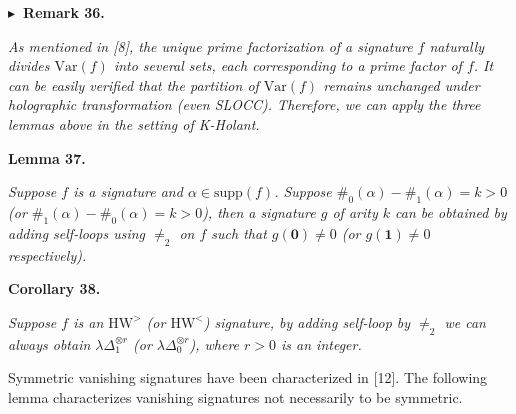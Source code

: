 \documentclass[10pt,a4paper]{article}
\begin{document}




\par\medskip\noindent\textbf{
$\blacktriangleright$ Remark 36.
}\par



\emph{As mentioned in [8], the unique prime factorization of a signature $f$ naturally divides $\text{Var}(f)$ into several sets, each corresponding to a prime factor of $f$. It can be easily verified that the partition of $\text{Var}(f)$ remains unchanged under holographic transformation (even SLOCC). Therefore, we can apply the three lemmas above in the setting of K-Holant.}\par







\par\medskip\noindent\textbf{
\textbf{Lemma 37}\textbf{.}
}\par



\emph{Suppose $f$ is a signature and $\alpha\in\text{supp}(f)$. Suppose $\#_{0}(\alpha)-\#_{1}(\alpha)=k>0$ (or $\#_{1}(\alpha)-\#_{0}(\alpha)=k>0$), then a signature $g$ of arity $k$ can be obtained by adding self-loops using $\neq_{2}$ on $f$ such that $g(\textbf{0})\neq 0$ (or $g(\textbf{1})\neq 0$ respectively).}\par







\par\medskip\noindent\textbf{
\textbf{Corollary 38}\textbf{.}
}\par



\emph{Suppose $f$ is an $\text{HW}^{>}$ (or $\text{HW}^{<}$) signature, by adding self-loop by $\neq_{2}$ we can always obtain $\lambda\Delta_{1}^{\otimes r}$ (or $\lambda\Delta_{0}^{\otimes r}$), where $r>0$ is an integer.}\par






Symmetric vanishing signatures have been characterized in [12]. The following lemma characterizes vanishing signatures not necessarily to be symmetric.\par
\end{document}
